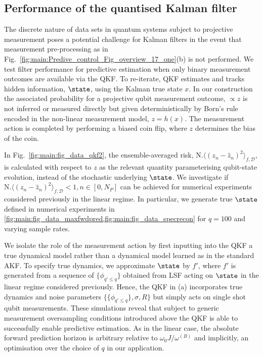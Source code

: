 {\subsection{Performance of the quantised Kalman filter}
The discrete nature of data sets in quantum systems subject to projective measurement poses a potential challenge for Kalman filters in the event that measurement pre-processing as in Fig.~\ref{fig:main:Predive_control_Fig_overview_17_one}(b) is not performed.  We test filter performance for predictive estimation when only binary measurement outcomes are available via the QKF.  To re-iterate, QKF estimates and tracks hidden information, $\state$, using the Kalman true state $x$.  In our construction the associated probability for a projective qubit measurement outcome, $\propto z$ is not inferred or measured directly but given deterministically by Born's rule encoded in the non-linear measurement model, $z = h(x)$. The measurement action is completed by performing a biased coin flip, where $z$ determines the bias of the coin.  

In Fig.~\ref{fig:main:fig_data_qkf2}, the ensemble-averaged risk, $\text{N.} \langle (z_n - \hat{z}_n)^2 \rangle_{f, \mathcal{D}} $, is calculated with respect to $z$ as the relevant quantity parameterising qubit-state evolution, instead of the stochastic underlying $\state$. We investigate if $\text{N.} \langle (z_n - \hat{z}_n)^2 \rangle_{f, \mathcal{D}} < 1, n\in [0, N_P] $ can be achieved for numerical experiments considered previously in the linear regime. In particular, we generate true $\state$ defined in numerical experiments in \cref{fig:main:fig_data_maxfwdpred,fig:main:fig_data_specrecon} for $q=100$ and varying sample rates.

We isolate the role of the measurement action by first inputting into the QKF a true dynamical model rather than a dynamical model learned as in the standard AKF.  To specify true dynamics, we approximate $\state$ by $f'$, where $f'$ is generated from a sequence of $\{ \phi_{q'\leq q}\}$ obtained from LSF acting on $\state$ in the linear regime considered previously.  Hence, the QKF in (a) incorporates true dynamics and noise parameters $\{\{\phi_{q' \leq q} \}, \sigma, R\}$ but simply acts on single shot qubit measurements.  These simulations reveal that subject to generic measurement oversampling conditions introduced above the QKF is able to successfully enable predictive estimation.  As in the linear case, the absolute forward prediction horizon is arbitrary relative to $\omega_0 J / \omega^{(B)}$ and implicitly, an optimisation over the choice of $q$ in our application. 

}
